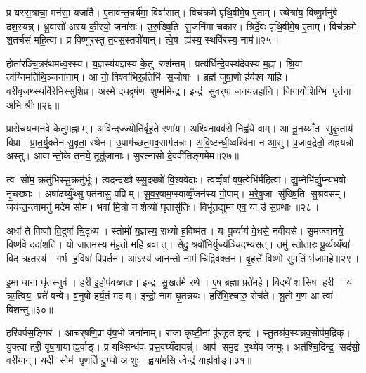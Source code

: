 प्र यस्स॒त्राचा॒ मन॑सा॒ यजा॑तै। ए॒ताव॑न्त॒न्नर्य॑मा॒ विवा॑सात्। विच॑क्रमे पृथि॒वीमे॒ष ए॒ताम्। ख्षेत्रा॑य॒ विष्णु॒र्मनु॑षे दश॒स्यन्न्। ध्रु॒वासो॑ अस्य की॒रयो॒ जना॑सः। उ॒रु॒ख्षि॒ति सु॒जनि॑मा चकार। त्रिर्दे॒वः पृ॑थि॒वीमे॒ष ए॒ताम्। विच॑क्रमे श॒तर्च॑सं महि॒त्वा। प्र विष्णु॑रस्तु त॒वस॒स्तवी॑यान्। त्वे॒ष ह्य॑स्य॒ स्थवि॑रस्य॒ नाम॑॥२५॥

होता॑रञ्चि॒त्रर॑थमध्व॒रस्य॑। य॒ज्ञस्य॑यज्ञस्य के॒तु रुश॑न्तम्। प्रत्य॑र्धिन्दे॒वस्य॑देवस्य म॒ह्ना। श्रि॒या त्व॑ग्निमति॑थि॒ञ्जना॑नाम्। आ नो॒ विश्वा॑भिरू॒तिभि॑ स॒जोषाः। ब्रह्म॑ जुषा॒णो ह॑र्यश्व याहि। वरी॑वृज॒थ्स्थवि॑रेभिस्सुशिप्र। अ॒स्मे दध॒द्वृष॑ण॒ शुष्म॑मिन्द्र। इन्द्र॑ सुव॒र्॒षा ज॒नय॒न्नहा॑नि। जि॒गायो॒शिग्भि॒ पृत॑ना अभि॒ श्रीः॥२६॥

प्रारो॑चय॒न्मन॑वे के॒तुमह्नाम्। अवि॑न्द॒ज्ज्योति॑र्बृह॒ते रणा॑य। अश्वि॑ना॒वव॑से॒ निह्व॑ये वाम्। आ नू॒नय्याँ॑त सुकृ॒ताय॑ विप्रा। प्रा॒त॒र्यु॒क्तेन॑ सु॒वृता॒ रथे॑न। उ॒पाग॑च्छत॒मव॒साग॑तन्नः। अ॒वि॒ष्टन्धी॒ष्वश्वि॑ना न आ॒सु। प्र॒जाव॒द्रेतो॒ अह्र॑यन्नो अस्तु। आवान्तो॒के तन॑ये॒ तूतु॑जानाः। सु॒रत्ना॑सो दे॒ववी॑तिङ्गमेम॥२७॥

त्व सो॑म॒ क्रतु॑भिस्सु॒क्रतु॑र्भूः। त्वदन्दख्षैस्सु॒दख्षो॑ वि॒श्ववे॑दाः। त्वव्वृँषा॑ वृष॒त्वेभि॑र्महि॒त्वा। द्यु॒म्नेभि॑र्द्यु॒म्न्य॑भवो नृ॒चख्षाः। अषा॑ढय्युँ॒थ्सु पृत॑नासु॒ पप्रिम्। सु॒व॒र्॒षाम॒प्स्वाव्वृँ॒जन॑स्य गो॒पाम्। भ॒रे॒षु॒जा सु॑ख्षि॒ति सु॒श्रव॑सम्। जय॑न्त॒न्त्वामनु॑ मदेम सोम। भवा॑ मि॒त्रो न शेव्यो॑ घृ॒तासु॑तिः। विभू॑तद्युम्न एव॒ या उ॑ स॒प्रथाः॥२८॥

अधा॑ ते विष्णो वि॒दुषा॑ चि॒दृध्य॑। स्तोमो॑ य॒ज्ञस्य॒ राध्यो॑ ह॒विष्म॑तः। यः पू॒र्व्याय॑ वे॒धसे॒ नवी॑यसे। सु॒मज्जा॑नये॒ विष्ण॑वे॒ ददा॑शति। यो जा॒तम॒स्य म॑ह॒तो म॒हि ब्रवात्। सेदु॒ श्रवो॑भिर्यु॒ज्य॑ञ्चिद॒भ्य॑सत्। तमु॑ स्तोतारः पू॒र्व्यय्यँथा॑ वि॒द ऋ॒तस्य॑। गर्भ ह॒विषा॑ पिपर्तन। आऽस्य॑ जा॒नन्तो॒ नाम॑ चिद्विवक्तन। बृ॒हत्ते॑ विष्णो सुम॒तिं भ॑जामहे॥२९॥

इ॒मा धा॒ना घृ॑त॒स्नुव॑। हरी॑ इ॒होप॑वख्षतः। इन्द्र सु॒खत॑मे॒ रथे। ए॒ष ब्र॒ह्मा प्रते॑म॒हे। वि॒दथे॑ शसिष॒ हरी। य ऋ॒त्विय॒ प्रते॑ वन्वे। व॒नुषो॑ हर्य॒तं मदम्। इन्द्रो॒ नाम॑ घृ॒तन्नयः। हरि॑भि॒श्चारु॒ सेच॑ते। श्रु॒तो ग॒ण आ त्वा॑ विशन्तु॥३०॥

हरि॑वर्पस॒ङ्गिर॑। आच॑र्‌षणि॒प्रा वृ॑ष॒भो जना॑नाम्। राजा॑ कृष्टी॒नां पु॑रुहू॒त इन्द्र॑। स्तु॒तश्र॑व॒स्यन्नव॒सोप॑म॒द्रिक्। यु॒क्त्वा हरी॒ वृष॒णायाह्य॒र्वाङ्। प्र यथ्सिन्ध॑वः प्रस॒वय्यँदायन्न्॑। आप॑ समु॒द्र र॒थ्ये॑व जग्मुः। अत॑श्चि॒दिन्द्र॒ सद॑सो॒ वरी॑यान्। यदी॒ सोम॑ पृ॒णति॑ दु॒ग्धो अ॒शुः। ह्वया॑मसि॒ त्वेन्द्र॑ या॒ह्य॑र्वाङ्॥३१॥

